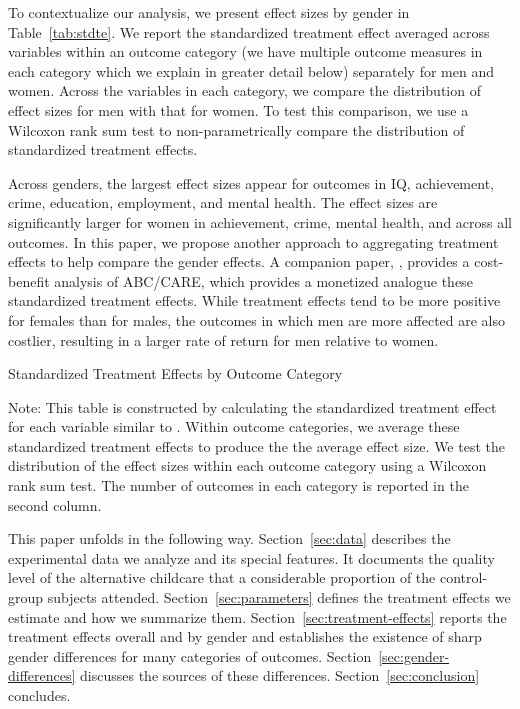 To contextualize our analysis, we present effect sizes by gender in Table~\ref{tab:stdte}. We report the standardized treatment effect averaged across variables within an outcome category (we have multiple outcome measures in each category which we explain in greater detail below) separately for men and women. Across the variables in each category, we compare the distribution of effect sizes for men with that for women. To test this comparison, we use a Wilcoxon rank sum test to non-parametrically compare the distribution of standardized treatment effects.

Across genders, the largest effect sizes appear for outcomes in IQ, achievement, crime, education, employment, and mental health. The effect sizes are significantly larger for women in achievement, crime, mental health, and across all outcomes. In this paper, we propose another approach to aggregating treatment effects to help compare the gender effects. A companion paper, \citet{Garcia_Heckman_Leaf_etal_2017_Comp_CBA_Unpublished}, provides a cost-benefit analysis of ABC/CARE, which provides a monetized analogue these standardized treatment effects. While treatment effects tend to be more positive for females than for males, the outcomes in which men are more affected are also costlier, resulting in a larger rate of return for men relative to women. 

\begin{table}[H]
\centering
\caption{Standardized Treatment Effects by Outcome Category}
\label{tab:stdte}
\begin{threeparttable}

\begin{tablenotes}
\footnotesize
\item Note: This table is constructed by calculating the standardized treatment effect for each variable similar to \citet{Katz_Kling_etal_2001_QJE,Finkelstein_etal_2012_Oregon_QJE}. Within outcome categories, we average these standardized treatment effects to produce the the average effect size. We test the distribution of the effect sizes within each outcome category using a Wilcoxon rank sum test. The number of outcomes in each category is reported in the second column. 
\end{tablenotes}
\end{threeparttable}
\end{table}


This paper unfolds in the following way. Section~\ref{sec:data} describes the experimental data we analyze and its special features. It documents the quality level of the alternative childcare that a considerable proportion of the control-group subjects attended. Section~\ref{sec:parameters} defines the treatment effects we estimate and how we summarize them. Section~\ref{sec:treatment-effects} reports the treatment effects overall and by gender and establishes the existence of sharp gender differences for many categories of outcomes. Section~\ref{sec:gender-differences} discusses the sources of these differences. Section~\ref{sec:conclusion} concludes.


